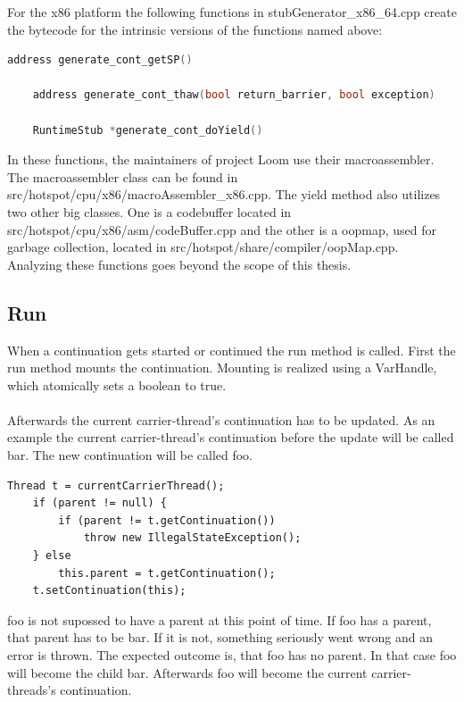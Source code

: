 For the x86 platform the following functions in stubGenerator\_x86\_64.cpp create the bytecode for the intrinsic versions of the functions named above:

\begin{lstlisting}[language=C++]
    address generate_cont_getSP()

    address generate_cont_thaw(bool return_barrier, bool exception)

    RuntimeStub *generate_cont_doYield()
\end{lstlisting}

In these functions, the maintainers of project Loom use their macroassembler. The macroassembler class can be found in src/hotspot/cpu/x86/macroAssembler\_x86.cpp. The yield method also utilizes two other big classes. One is a codebuffer located in src/hotspot/cpu/x86/asm/codeBuffer.cpp and the other is a oopmap, used for garbage collection, located in src/hotspot/share/compiler/oopMap.cpp.
\\
Analyzing these functions goes beyond the scope of this thesis.

\subsection{Run}
When a continuation gets started or continued the run method is called.
First the run method mounts the continuation. Mounting is realized using a VarHandle, which atomically sets a boolean to true.
\\
\\
Afterwards the current carrier-thread's continuation has to be updated. As an example the current carrier-thread's continuation before the update will be called bar. The new continuation will be called foo.

\begin{lstlisting}[language=custom-java]
    Thread t = currentCarrierThread();
    if (parent != null) {
        if (parent != t.getContinuation())
            throw new IllegalStateException();
    } else
        this.parent = t.getContinuation();
    t.setContinuation(this);
\end{lstlisting}

foo is not supossed to have a parent at this point of time. If foo has a parent, that parent has to be bar. If it is not, something seriously went wrong and an error is thrown. The expected outcome is, that foo has no parent. In that case foo will become the child bar. Afterwards foo will become the current carrier-threads's continuation.


